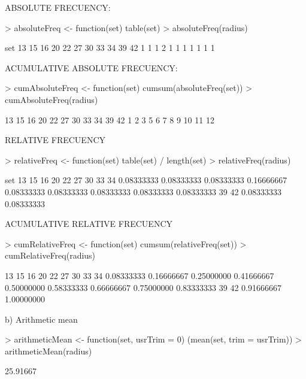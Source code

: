 \documentclass[a4paper]{article}
\begin{document}
ABSOLUTE FRECUENCY:
\begin{Schunk}
\begin{Sinput}
> absoluteFreq    <- function(set) {table(set)}
> absoluteFreq(radius)
\end{Sinput}
\begin{Soutput}
set
13 15 16 20 22 27 30 33 34 39 42 
 1  1  1  2  1  1  1  1  1  1  1 
\end{Soutput}
\end{Schunk}
ACUMULATIVE ABSOLUTE FRECUENCY:
\begin{Schunk}
\begin{Sinput}
> cumAbsoluteFreq <- function(set) {cumsum(absoluteFreq(set))}
> cumAbsoluteFreq(radius)
\end{Sinput}
\begin{Soutput}
13 15 16 20 22 27 30 33 34 39 42 
 1  2  3  5  6  7  8  9 10 11 12 
\end{Soutput}
\end{Schunk}
RELATIVE FRECUENCY
\begin{Schunk}
\begin{Sinput}
> relativeFreq <- function(set) {table(set) / length(set)}
> relativeFreq(radius)
\end{Sinput}
\begin{Soutput}
set
        13         15         16         20         22         27         30         33         34 
0.08333333 0.08333333 0.08333333 0.16666667 0.08333333 0.08333333 0.08333333 0.08333333 0.08333333 
        39         42 
0.08333333 0.08333333 
\end{Soutput}
\end{Schunk}
ACUMULATIVE RELATIVE FRECUENCY
\begin{Schunk}
\begin{Sinput}
> cumRelativeFreq <- function(set) {cumsum(relativeFreq(set))}
> cumRelativeFreq(radius)
\end{Sinput}
\begin{Soutput}
        13         15         16         20         22         27         30         33         34 
0.08333333 0.16666667 0.25000000 0.41666667 0.50000000 0.58333333 0.66666667 0.75000000 0.83333333 
        39         42 
0.91666667 1.00000000 
\end{Soutput}
\end{Schunk}

		b) Arithmetic mean
\begin{Schunk}
\begin{Sinput}
> arithmeticMean <- function(set, usrTrim = 0) (mean(set, trim = usrTrim))
> arithmeticMean(radius)
\end{Sinput}
\begin{Soutput}
[1] 25.91667
\end{Soutput}
\end{Schunk}
\end{document}
